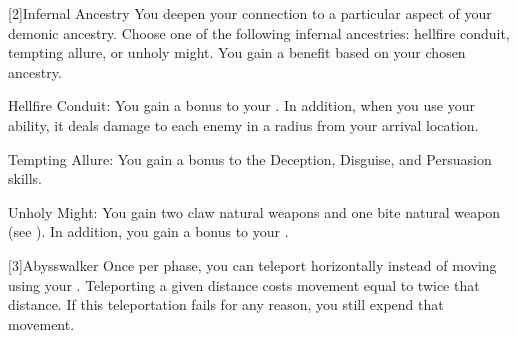     [2]{Infernal Ancestry} You deepen your connection to a particular aspect of your demonic ancestry.
      Choose one of the following infernal ancestries: hellfire conduit, tempting allure, or unholy might.
      You gain a benefit based on your chosen ancestry.
      \begin{raggeditemize}
        \item Hellfire Conduit: You gain a  bonus to your .
          In addition, when you use your  ability, it deals damage to each enemy in a \smallarea radius from your arrival location.
        \item Tempting Allure: You gain a  bonus to the Deception, Disguise, and Persuasion skills.
        \item Unholy Might: You gain two claw natural weapons and one bite natural weapon (see ).
          In addition, you gain a  bonus to your .
      \end{raggeditemize}

    [3]{Abysswalker} Once per phase, you can teleport horizontally instead of moving using your .
    Teleporting a given distance costs movement equal to twice that distance.
    If this teleportation fails for any reason, you still expend that movement.

